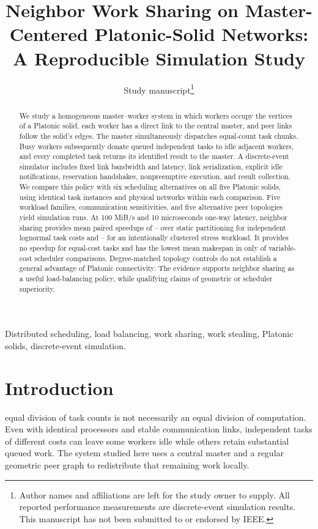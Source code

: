 \documentclass[10pt,journal,twocolumn]{IEEEtran}
\title{Neighbor Work Sharing on Master-Centered Platonic-Solid Networks: A Reproducible Simulation Study}
\author{Study manuscript\thanks{Author names and affiliations are left for the study owner to supply. All reported performance measurements are discrete-event simulation results. This manuscript has not been submitted to or endorsed by IEEE.}}
\begin{document}
\maketitle

\begin{abstract}
We study a homogeneous master--worker system in which workers occupy the vertices of a Platonic solid, each worker has a direct link to the central master, and peer links follow the solid's edges. The master simultaneously dispatches equal-count task chunks. Busy workers subsequently donate queued independent tasks to idle adjacent workers, and every completed task returns its identified result to the master. A discrete-event simulator includes fixed link bandwidth and latency, link serialization, explicit idle notifications, reservation handshakes, nonpreemptive execution, and result collection. We compare this policy with six scheduling alternatives on all five Platonic solids, using identical task instances and physical networks within each comparison. Five workload families, communication sensitivities, and five alternative peer topologies yield  simulation runs. At 100 MiB/s and 10 microseconds one-way latency, neighbor sharing provides mean paired speedups of -- over static partitioning for independent lognormal task costs and -- for an intentionally clustered stress workload. It provides no speedup for equal-cost tasks and has the lowest mean makespan in only  of  variable-cost scheduler comparisons. Degree-matched topology controls do not establish a general advantage of Platonic connectivity. The evidence supports neighbor sharing as a useful load-balancing policy, while qualifying claims of geometric or scheduler superiority.
\end{abstract}

\begin{IEEEkeywords}
Distributed scheduling, load balancing, work sharing, work stealing, Platonic solids, discrete-event simulation.
\end{IEEEkeywords}

\section{Introduction}
 equal division of task counts is not necessarily an equal division of computation. Even with identical processors and stable communication links, independent tasks of different costs can leave some workers idle while others retain substantial queued work. The system studied here uses a central master and a regular geometric peer graph to redistribute that remaining work locally.
\end{document}
